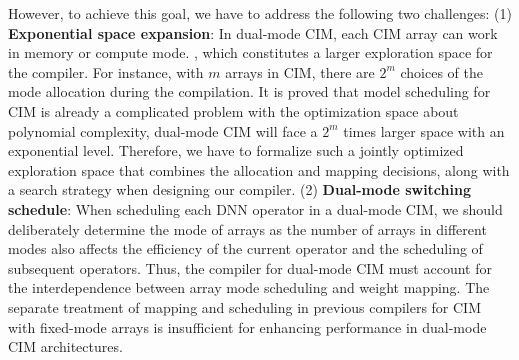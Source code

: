 However, to achieve this goal, we have to address the following two challenges: 
(1) \textbf{Exponential space expansion}: 
In dual-mode CIM, each CIM array can work in memory or compute mode. , which constitutes a larger exploration space for the compiler.
For instance, with $m$ arrays in CIM, there are $2^m$ choices of the mode allocation during the compilation. It is proved that model scheduling for CIM is already a complicated problem with the optimization space about polynomial complexity, dual-mode CIM will face a $2^m$ times larger space with an exponential level. 
Therefore, we have to formalize such a jointly optimized exploration space that combines the allocation and mapping decisions, along with a search strategy when designing our compiler.
(2) \textbf{Dual-mode switching schedule}: When scheduling each DNN operator in a dual-mode CIM, we should deliberately determine the mode of arrays as the number of arrays in different modes also affects the efficiency of the current operator and the scheduling of subsequent operators. Thus, the compiler for dual-mode CIM must account for the interdependence between array mode scheduling and weight mapping. The separate treatment of mapping and scheduling in previous compilers for CIM with fixed-mode arrays is insufficient for enhancing performance in dual-mode CIM architectures.

